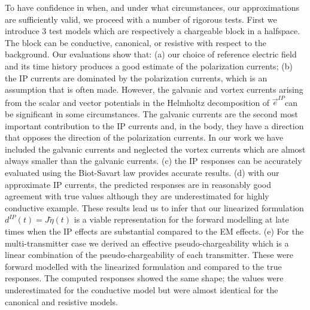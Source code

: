 \documentclass[extra,mreferee]{gji}
\newcommand {\e}  { {\vec e} }
\newcommand{\peta}{\tilde{\eta}}
\begin{document}
To have confidence in when, and under what circumstances, our approximations are sufficiently valid, we proceed with a number of rigorous tests. First we introduce 3 test models which are respectively a chargeable block in a halfspace. The block can be conductive, canonical, or resistive with respect to the background. Our evaluations show that: 
(a) our choice of reference electric field and its time history produces a good estimate of the polarization currents;
(b) the IP currents are dominated by the polarization currents, which is an assumption that is often made. However, the galvanic and vortex currents arising from the scalar and vector potentials in the Helmholtz decomposition of $\e^{IP}$can be significant in some circumstances. The galvanic currents are the second most important contribution to the IP currents and, in the body, they have a direction that opposes the direction of the polarization currents. In our work we have included the galvanic currents and neglected the vortex currents which are almost always smaller than the galvanic currents.
(c) the IP responses can be accurately evaluated using the Biot-Savart law provides accurate results.
(d) with our approximate IP currents, the predicted responses are in reasonably good agreement with true values although they are underestimated for highly conductive example. These results lead us to infer that our linearized formulation $d^{IP}(t)=J\peta(t)$ is a viable representation for the forward modelling at late times when  the IP effects are substantial compared to the EM effects. 
(e) For the multi-transmitter case we derived an effective pseudo-chargeability which is a linear combination of the pseudo-chargeability of each transmitter. These were forward modelled with the linearized formulation and compared to the true responses. The computed responses showed the same shape; the values were underestimated for the conductive model but were almost identical for the canonical and resistive models.  
\end{document}
